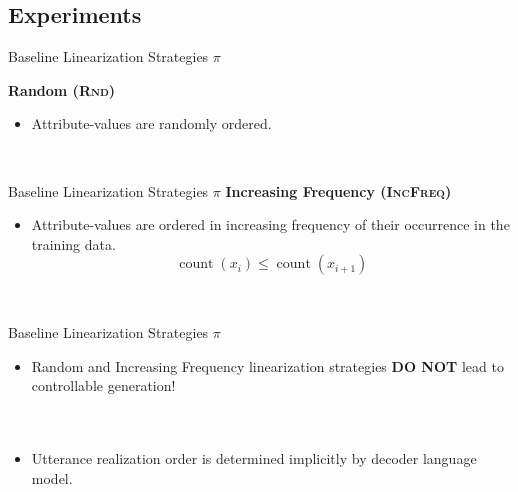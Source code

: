 \subsection{Experiments}


\begin{frame}{Baseline Linearization Strategies $\pi$}

    \textbf{Random (\textsc{Rnd})}
    \begin{itemize}
        \item Attribute-values are randomly ordered.
    \end{itemize}~\\
\end{frame}
\begin{frame}{Baseline Linearization Strategies $\pi$}
    \textbf{Increasing Frequency (\textsc{IncFreq})}
    \begin{itemize}
        \item Attribute-values are ordered in increasing frequency of 
            their occurrence in the training data.\[\operatorname{count}(x_i) \le \operatorname{count}(x_{i+1})\]
    \end{itemize}~\\

\end{frame}

\begin{frame}{Baseline Linearization Strategies $\pi$}
\begin{itemize}\item Random and Increasing Frequency linearization strategies 
            \alert{\textbf{DO NOT}} lead to controllable generation!\\~\\~\\
        
        \item Utterance realization order is determined implicitly by decoder language model.
    \end{itemize}
\end{frame}

